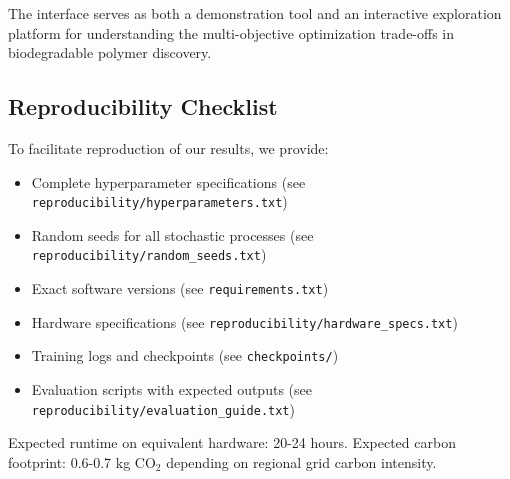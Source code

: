 \documentclass[twocolumn,10pt]{article}
\begin{document}
The interface serves as both a demonstration tool and an interactive exploration platform for understanding the multi-objective optimization trade-offs in biodegradable polymer discovery.

\subsection{Reproducibility Checklist}

To facilitate reproduction of our results, we provide:
\begin{itemize}[noitemsep,leftmargin=*]
\item Complete hyperparameter specifications (see \texttt{reproducibility/hyperparameters.txt})
\item Random seeds for all stochastic processes (see \texttt{reproducibility/random\_seeds.txt})
\item Exact software versions (see \texttt{requirements.txt})
\item Hardware specifications (see \texttt{reproducibility/hardware\_specs.txt})
\item Training logs and checkpoints (see \texttt{checkpoints/})
\item Evaluation scripts with expected outputs (see \texttt{reproducibility/evaluation\_guide.txt})
\end{itemize}

Expected runtime on equivalent hardware: 20-24 hours. Expected carbon footprint: 0.6-0.7 kg CO$_2$ depending on regional grid carbon intensity.
\end{document}
